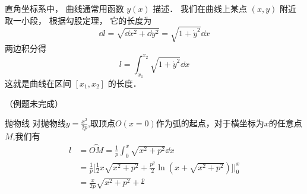 

直角坐标系中， 曲线通常用函数 $y(x)$ 描述． 我们在曲线上某点 $(x, y)$ 附近取一小段， 根据勾股定理， 它的长度为
\begin{equation}
\dd{l} = \sqrt{\dd{x}^2 + \dd{y}^2} = \sqrt{1 + \dot y^2} \dd{x}
\end{equation}
两边积分得
\begin{equation}\label{CurLen_eq1}
l = \int_{x_1}^{x_2} \sqrt{1 + \dot y^2} \dd{x}
\end{equation}
这就是曲线在区间 $[x_1, x_2]$ 的长度．

（例题未完成）
\begin{example}{抛物线}
对抛物线$y=\frac{x^2}{2p}$,取顶点$O(x=0)$作为弧的起点，对于横坐标为$x$的任意点$M$,我们有
\begin{equation}
\begin{aligned}
l&=\overset{\frown}{OM}=\frac{1}{p}\int_{0}^{x}\sqrt{x^2+p^2}\dd{x}\\
&=\frac{1}{p}\bigg[\frac{1}{2}x\sqrt{x^2+p^2}+\frac{p^2}{2}\ln(x+\sqrt{x^2+p^2})\bigg]\Bigg\lvert_{0}^{x}\\
&=\frac{x}{2p}\sqrt{x^2+p^2}+\frac{p}{}
\end{aligned}
\end{equation}

\end{example}